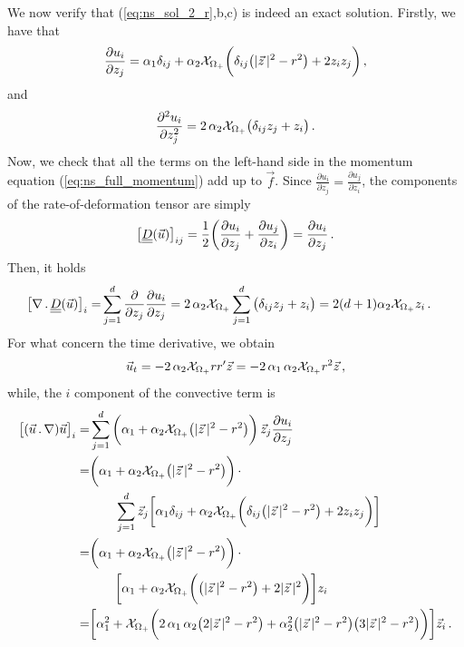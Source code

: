 We now verify that (\ref{eq:ns_sol_2_r},b,c) is indeed an exact solution.
Firstly, we have that
\begin{equation*}
\frac{\partial u_i}{\partial z_j} = \alpha_1 \delta_{ij}
+ \alpha_2\mathrm{\mathcal{X}}_{\Omega_+}\bigg(\delta_{ij}\big(|\vec z\,|^2-r^2\big)
+ 2z_iz_j\bigg)\,,
\end{equation*}
and
\begin{equation*}
\frac{\partial^2 u_i}{\partial z_j^2} =
2 \,\alpha_2\mathrm{\mathcal{X}}_{\Omega_+}\big(\delta_{ij} z_j+ z_i\big)\,.
\end{equation*}
Now, we check that all the terms on the left-hand side in the momentum equation
(\ref{eq:ns_full_momentum}) add up to $\vec f$.  Since $\frac{\partial
u_i}{\partial z_j}=\frac{\partial u_j}{\partial z_i}$, the components of the
rate-of-deformation tensor are simply
\begin{equation*}
\big[\mat D(\vec u) \big]_{ij} = \frac{1}{2}\bigg(\frac{\partial
u_i}{\partial z_j} + \frac{\partial u_j}{\partial z_i}\bigg)=
\frac{\partial u_i}{\partial z_j}\,.
\end{equation*}
Then, it holds
\begin{align*}
\big[\nabla\,.\,\mat D(\vec u)\big]_i = &
\sum_{j=1}^d\frac{\partial}{\partial z_j} \frac{\partial u_i}{\partial z_j}
= 2 \,\alpha_2\charfcn{\Omega_+}\sum_{j=1}^d\big(\delta_{ij} z_j + z_i \big)
= 2(d+1)\alpha_2\charfcn{\Omega_+}z_i\,.
\end{align*}
For what concern the time derivative, we obtain
\begin{align*}
\vec u_t = -2\,\alpha_2\mathrm{\mathcal{X}}_{\Omega_+}rr^\prime\vec z =
-2\,\alpha_1\,\alpha_2\mathrm{\mathcal{X}}_{\Omega_+}r^2\vec z\,,
\end{align*}
while, the $i$ component of the convective term is
\begin{align*}
\big[(\vec u \,.\, \nabla)\vec u\big]_i =&
\sum_{j=1}^d \bigg(\alpha_1+\alpha_2\mathrm{\mathcal{X}}_{\Omega_+}
\big(|\vec z\,|^2-r^2\big)\bigg)\,\vec z_j
\frac{\partial u_i}{\partial z_j} \\
= &\bigg(\alpha_1+\alpha_2\mathrm{\mathcal{X}}_{\Omega_+}
\big(|\vec z\,|^2-r^2\big)\bigg)\,\cdot \\
&\qquad \sum_{j=1}^d\vec z_j\bigg[
\alpha_1 \delta_{ij}
+ \alpha_2\mathrm{\mathcal{X}}_{\Omega_+}\bigg(\delta_{ij}\big(|\vec z\,|^2-r^2\big)
+ 2z_iz_j\bigg)\bigg] \\
= &\bigg(\alpha_1+\alpha_2\mathrm{\mathcal{X}}_{\Omega_+}
\big(|\vec z\,|^2-r^2\big)\bigg)\,\cdot \\
&\qquad \bigg[
\alpha_1 + \alpha_2\mathrm{\mathcal{X}}_{\Omega_+}\bigg(\big(|\vec z\,|^2-r^2\big)
+ 2|\vec z\,|^2\bigg)\bigg]z_i \\
= &\bigg[\alpha_1^2
+ \mathrm{\mathcal{X}}_{\Omega_+}\bigg(2\,\alpha_1\,\alpha_2\big(2|\vec z\,|^2-r^2\big)
+ \alpha_2^2\big(|\vec z\,|^2-r^2\big)\big(3|\vec z\,|^2
- r^2\big)\bigg)\bigg]\vec z_i\,.
\end{align*}
